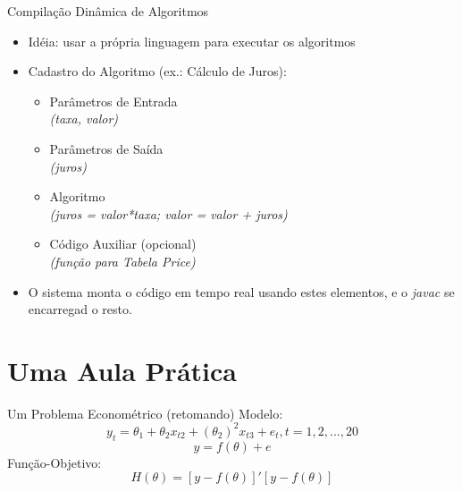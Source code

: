 \documentclass{beamer}
\begin{document}
\begin{frame}{Compilação Dinâmica de Algoritmos}
	\begin{itemize}
		\item Idéia: usar a própria linguagem para executar os algoritmos
		\item Cadastro do Algoritmo (ex.: Cálculo de Juros):
		\begin{itemize}
			\item Parâmetros de Entrada\\\textit{(taxa, valor)}
			\item Parâmetros de Saída \\\textit{(juros)}
			\item Algoritmo \\\textit{(juros = valor*taxa; valor = valor + juros)}
			\item Código Auxiliar (opcional)\\ \textit{(função para Tabela Price)}
		\end{itemize}
		\item O sistema monta o código em tempo real usando estes elementos, e o \textit{javac} se encarregad o resto.
	\end{itemize}
\end{frame}

\begin{frame}
\begin{center}
\end{center}
\end{frame}

\section{Uma Aula Prática}

\begin{frame}{Um Problema Econométrico (retomando)}
Modelo:
\[ y_t = \theta_1 + \theta_2 x_{t2} + (\theta_2)^2 x_{t3} +e_t , t = 1,2,...,20 \]
\[ y = f(\theta)+e\]
Função-Objetivo: \[H(\theta) = [y - f(\theta)]'[y - f(\theta)] \]
\end{frame}
\end{document}
